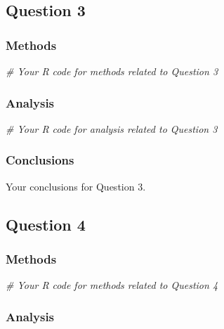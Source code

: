 \documentclass[
]{article}
\newenvironment{Shaded}{\begin{snugshade}}{\end{snugshade}}
\newcommand{\CommentTok}[1]{\textcolor[rgb]{0.56,0.35,0.01}{\textit{#1}}}
\begin{document}
\subsection{Question 3}\label{question-3}

\subsubsection{Methods}\label{methods-3}

\begin{Shaded}
\begin{Highlighting}[]
\CommentTok{\# Your R code for methods related to Question 3}
\end{Highlighting}
\end{Shaded}

\subsubsection{Analysis}\label{analysis-3}

\begin{Shaded}
\begin{Highlighting}[]
\CommentTok{\# Your R code for analysis related to Question 3}
\end{Highlighting}
\end{Shaded}

\subsubsection{Conclusions}\label{conclusions-3}

Your conclusions for Question 3.

\subsection{Question 4}\label{question-4}

\subsubsection{Methods}\label{methods-4}

\begin{Shaded}
\begin{Highlighting}[]
\CommentTok{\# Your R code for methods related to Question 4}
\end{Highlighting}
\end{Shaded}

\subsubsection{Analysis}\label{analysis-4}
\end{document}
